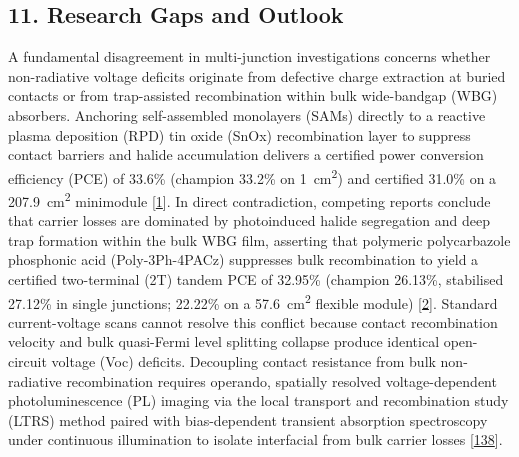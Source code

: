 \documentclass[
  11pt,
]{article}
\begin{document}
\subsection{11. Research Gaps and
Outlook}\label{research-gaps-and-outlook}

A fundamental disagreement in multi-junction investigations concerns
whether non-radiative voltage deficits originate from defective charge
extraction at buried contacts or from trap-assisted recombination within
bulk wide-bandgap (WBG) absorbers. Anchoring self-assembled monolayers
(SAMs) directly to a reactive plasma deposition (RPD) tin oxide (SnOx)
recombination layer to suppress contact barriers and halide accumulation
delivers a certified power conversion efficiency (PCE) of 33.6\%
(champion 33.2\% on \qty{1}{\centi\meter\squared}) and certified 31.0\%
on a \qty{207.9}{\centi\meter\squared} minimodule
{[}\href{https://doi.org/10.1126/science.aef5355}{1}{]}. In direct
contradiction, competing reports conclude that carrier losses are
dominated by photoinduced halide segregation and deep trap formation
within the bulk WBG film, asserting that polymeric polycarbazole
phosphonic acid (Poly-3Ph-4PACz) suppresses bulk recombination to yield
a certified two-terminal (2T) tandem PCE of 32.95\% (champion 26.13\%,
stabilised 27.12\% in single junctions; 22.22\% on a
\qty{57.6}{\centi\meter\squared} flexible module)
{[}\href{https://doi.org/10.1038/s41467-026-73276-w}{2}{]}. Standard
current-voltage scans cannot resolve this conflict because contact
recombination velocity and bulk quasi-Fermi level splitting collapse
produce identical open-circuit voltage (Voc) deficits. Decoupling
contact resistance from bulk non-radiative recombination requires
operando, spatially resolved voltage-dependent photoluminescence (PL)
imaging via the local transport and recombination study (LTRS) method
paired with bias-dependent transient absorption spectroscopy under
continuous illumination to isolate interfacial from bulk carrier losses
{[}\href{https://doi.org/10.1002/smll.202513958}{138}{]}.
\end{document}
